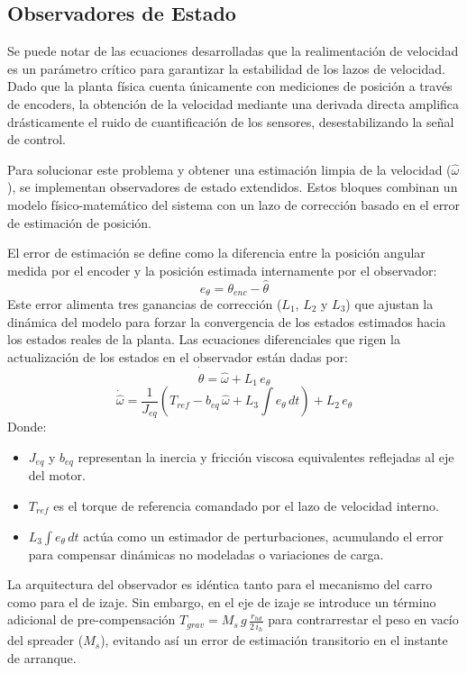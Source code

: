 \documentclass[11pt]{article}                                    %
\begin{document}
\subsection{Observadores de Estado}
Se puede notar de las ecuaciones desarrolladas que la realimentación de velocidad es un parámetro crítico para garantizar la estabilidad de los lazos de velocidad. Dado que la planta física cuenta únicamente con mediciones de posición a través de encoders, la obtención de la velocidad mediante una derivada directa amplifica drásticamente el ruido de cuantificación de los sensores, desestabilizando la señal de control.

Para solucionar este problema y obtener una estimación limpia de la velocidad ($\hat{\omega}$), se implementan observadores de estado extendidos. Estos bloques combinan un modelo físico-matemático del sistema con un lazo de corrección basado en el error de estimación de posición.

El error de estimación se define como la diferencia entre la posición angular medida por el encoder y la posición estimada internamente por el observador:
$$e_{\theta} = \theta_{enc} - \hat{\theta}$$
Este error alimenta tres ganancias de corrección ($L_1$, $L_2$ y $L_3$) que ajustan la dinámica del modelo para forzar la convergencia de los estados estimados hacia los estados reales de la planta. Las ecuaciones diferenciales que rigen la actualización de los estados en el observador están dadas por:
$$\dot{\hat{\theta}} = \hat{\omega} + L_1 \, e_{\theta}$$
$$\dot{\hat{\omega}} = \frac{1}{J_{eq}} \left( T_{ref} - b_{eq} \, \hat{\omega} + L_3 \int e_{\theta} \, dt \right) + L_2 \, e_{\theta}$$
Donde:
\begin{itemize}
    \item $J_{eq}$ y $b_{eq}$ representan la inercia y fricción viscosa equivalentes reflejadas al eje del motor.
    \item $T_{ref}$ es el torque de referencia comandado por el lazo de velocidad interno.
    \item $L_3 \int e_{\theta} \, dt$ actúa como un estimador de perturbaciones, acumulando el error para compensar dinámicas no modeladas o variaciones de carga.
\end{itemize}

La arquitectura del observador es idéntica tanto para el mecanismo del carro como para el de izaje. Sin embargo, en el eje de izaje se introduce un término adicional de pre-compensación $T_{grav} = M_s \, g \, \frac{r_{hd}}{2 \, i_h}$ para contrarrestar el peso en vacío del spreader ($M_s$), evitando así un error de estimación transitorio en el instante de arranque.
\end{document}
